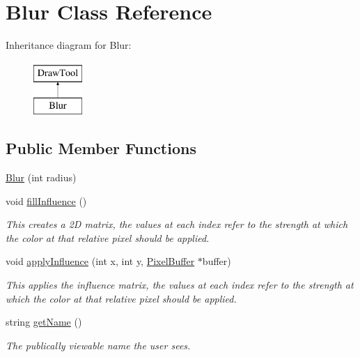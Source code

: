 \hypertarget{classBlur}{\section{Blur Class Reference}
\label{classBlur}
}
Inheritance diagram for Blur\-:\begin{figure}[H]
\begin{center}
\leavevmode
\includegraphics[height=2.000000cm]{classBlur}
\end{center}
\end{figure}
\subsection*{Public Member Functions}
\begin{DoxyCompactItemize}
\item 
\hyperlink{classBlur_a4cf976a139e3745e022c6b4fb7b18efb}{Blur} (int radius)
\item 
\hypertarget{classBlur_a6db41e9d70814abd7d188eee08779c7a}{void \hyperlink{classBlur_a6db41e9d70814abd7d188eee08779c7a}{fill\-Influence} ()}\label{classBlur_a6db41e9d70814abd7d188eee08779c7a}

\begin{DoxyCompactList}\small\item\em This creates a 2\-D matrix, the values at each index refer to the strength at which the color at that relative pixel should be applied. \end{DoxyCompactList}\item 
\hypertarget{classBlur_a74a6e5acef4b46edc5c79e909296ff53}{void \hyperlink{classBlur_a74a6e5acef4b46edc5c79e909296ff53}{apply\-Influence} (int x, int y, \hyperlink{classPixelBuffer}{Pixel\-Buffer} $\ast$buffer)}\label{classBlur_a74a6e5acef4b46edc5c79e909296ff53}

\begin{DoxyCompactList}\small\item\em This applies the influence matrix, the values at each index refer to the strength at which the color at that relative pixel should be applied. \end{DoxyCompactList}\item 
\hypertarget{classBlur_ad04ff612443d12024ae057ae757e6271}{string \hyperlink{classBlur_ad04ff612443d12024ae057ae757e6271}{get\-Name} ()}\label{classBlur_ad04ff612443d12024ae057ae757e6271}

\begin{DoxyCompactList}\small\item\em The publically viewable name the user sees. \end{DoxyCompactList}\end{DoxyCompactItemize}

